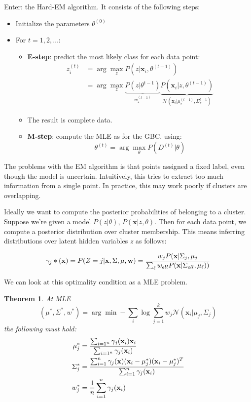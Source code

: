 \documentclass[a4paper,10pt,twoside]{article}
\newtheorem{theorem}{Theorem}
\begin{document}
Enter: the Hard-EM algorithm. It consists of the following steps:


\begin{itemize}
\item Initialize the parameters $\theta^{(0)}$
\item For $t=1,2,\ldots$:
  \begin{itemize}
  \item \textbf{E-step}: predict the most likely class for each data point:
    \begin{align*}
      z_i^{(t)}&=\arg\max_{z}P(z|\mathbf{x}_i,\theta^{(t-1)})\\
      &= \arg\max_{z}\underbrace{P(z|\theta^{t-1})}_{w_z^{(t-1)}} \underbrace{P(\mathbf{x}_i|z,\theta^{(t-1)})}_{\mathcal{N}(\mathbf{x}_i|\mu_z^{(t-1)},\Sigma_z^{t-1})}
    \end{align*}
  \item The result is complete data.
  \item \textbf{M-step}: compute the MLE as for the GBC, using:
    \begin{equation*}
      \theta^{(t)}=\arg\max_{\theta}P(D^{(t)}|\theta)
    \end{equation*}
  \end{itemize}
\end{itemize}

The problems with the EM algorithm is that points assigned a fixed label, even though the model is uncertain. Intuitively, this tries to extract too much information from a single point. In practice, this may work poorly if clusters are overlapping.

Ideally we want to compute the posterior probabilities of belonging to a cluster. Suppose we're given a model $P(z|\theta)$, $P(\mathbf{x}|z,\theta)$. Then for each data point, we compute a posterior distribution over cluster membership. This means inferring distributions over latent hidden variables $z$ as follows:

\begin{equation*}
  \gamma_j*(\mathbf{x}) = P(Z=j|\mathbf{x},\Sigma,\mu,\mathbf{w}) = {w_j P(\mathbf{x}|\Sigma_j,\mu_j\over \sum_{\ell}w_{ell}P(\mathbf{x}|\Sigma_{ell},\mu_{\ell}))}
\end{equation*}

We can look at this optimality condition as a MLE problem.

\begin{theorem}
  At MLE
  \begin{equation*}
    (\mu^*,\Sigma^*,w^*)=\arg\min-\sum_i\log\sum_{j=1}^kw_j\mathcal{N}(\mathbf{x}_i|\mu_j,\Sigma_j)
  \end{equation*}
  the following must hold:
  \begin{align*}
    \mu_j^*&={\sum_{i=1^n}\gamma_j(\mathbf{x}_i)\mathbf{x}_i\over \sum_{i=1^n}\gamma_j(\mathbf{x}_i)}\\ \Sigma_j^*&={\sum_{i=1}^{n}\gamma_j(\mathbf{x})(\mathbf{x}_i-\mu_j^*)(\mathbf{x}_i-\mu_j^*)^T \over\sum_{i=1}^n\gamma_j(\mathbf{x}_i)}\\
    w_j^*&={1\over n}\sum_{i=1}^{n}\gamma_j(\mathbf{x}_i)
  \end{align*}
\end{theorem}
\end{document}
